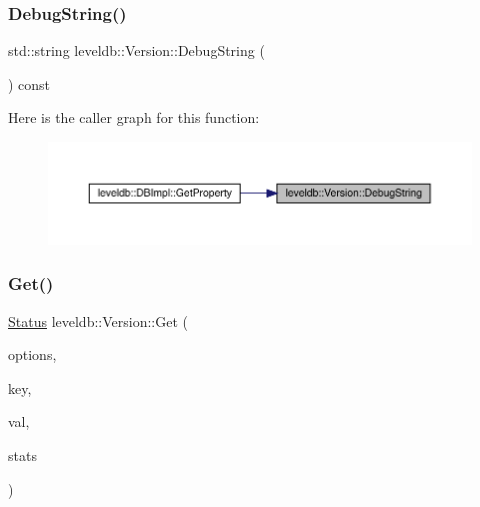 \subsubsection{\texorpdfstring{DebugString()}{DebugString()}}
{\footnotesize\ttfamily std\+::string leveldb\+::\+Version\+::\+Debug\+String (\begin{DoxyParamCaption}{ }\end{DoxyParamCaption}) const}

Here is the caller graph for this function\+:
\nopagebreak
\begin{figure}[H]
\begin{center}
\leavevmode
\includegraphics[width=350pt]{classleveldb_1_1_version_abf1f1702c439aea453b041d5db6b7e63_icgraph}
\end{center}
\end{figure}
\mbox{\label{classleveldb_1_1_version_a42c439d4a2a767fe281c7a75d4255038}} 
\subsubsection{\texorpdfstring{Get()}{Get()}}
{\footnotesize\ttfamily \mbox{\hyperlink{classleveldb_1_1_status}{Status}} leveldb\+::\+Version\+::\+Get (\begin{DoxyParamCaption}\item[{const \mbox{\hyperlink{structleveldb_1_1_read_options}{Read\+Options}} \&}]{options,  }\item[{const \mbox{\hyperlink{classleveldb_1_1_lookup_key}{Lookup\+Key}} \&}]{key,  }\item[{std\+::string $\ast$}]{val,  }\item[{\mbox{\hyperlink{structleveldb_1_1_version_1_1_get_stats}{Get\+Stats}} $\ast$}]{stats }\end{DoxyParamCaption})}

